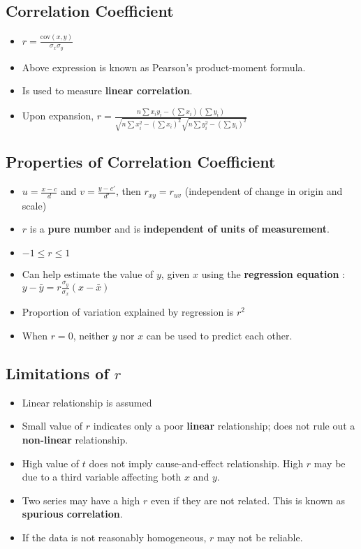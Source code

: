 \subsection*{Correlation Coefficient}
\begin{itemize}
    \item $r = \frac{\text{cov}(x, y)}{\sigma_x \sigma_y}$
    \item Above expression is known as Pearson's product-moment formula.
    \item Is used to measure \textbf{linear correlation}.
    \item Upon expansion, $r = \frac{n \sum x_i y_i - (\sum x_i)(\sum y_i)}{\sqrt{n \sum x_i^2 - (\sum x_i)^2} \sqrt{n \sum y_i^2 - (\sum y_i)^2}}$
\end{itemize}

\subsection*{Properties of Correlation Coefficient}

\begin{itemize}
    \item $u = \frac{x - c}{d}$ and $v = \frac{y - c'}{d'}$, then $r_{xy} = r_{uv}$ (independent of change in origin and scale)

    \item $r$ is a \textbf{pure number} and is \textbf{independent of units of measurement}.
    \item $-1 \leq r \leq 1$
    \item Can help estimate the value of $y$, given $x$ using the \textbf{ regression equation }: $y - \bar{y} = r \frac{\sigma_y}{\sigma_x} (x - \bar{x})$
    \item Proportion of variation explained by regression is $r^2$
    \item When $r = 0$, neither $y$ nor $x$ can be used to predict each other.
\end{itemize}

\subsection*{Limitations of $r$}

\begin{itemize}
    \item Linear relationship is assumed
    \item Small value of $r$ indicates only a poor \textbf{linear} relationship; does not rule out a \textbf{non-linear} relationship.
    \item High value of $t$ does not imply cause-and-effect relationship. High $r$ may be due to a third variable affecting both $x$ and $y$.
    \item Two series may have a high $r$ even if they are not related. This is known as \textbf{spurious correlation}.
    \item If the data is not reasonably homogeneous, $r$ may not be reliable.
\end{itemize}

